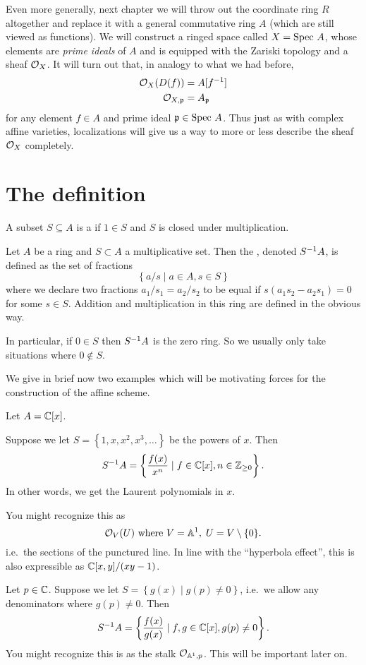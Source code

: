 Even more generally,
next chapter we will throw out the coordinate ring $R$
altogether and replace it with a general commutative ring $A$
(which are still viewed as functions).
We will construct a ringed space called $X = \text{Spec } A$,
whose elements are \emph{prime ideals} of $A$
and is equipped with the Zariski topology and a sheaf $\mathcal O_X$.
It will turn out that, in analogy to what we had before,
\begin{align*}
	\mathcal O_X(D(f)) &= A[f^{-1}] \\
	\mathcal O_{X,\mathfrak p} &= A_\mathfrak p
\end{align*}
for any element $f \in A$ and prime ideal $\mathfrak p \in \text{Spec } A$.
Thus just as with complex affine varieties,
localizations will give us a way to more or less
describe the sheaf $\mathcal O_X$ completely.

\section{The definition}
\begin{definition}
	A subset $S \subseteq A$ is a 
	if $1 \in S$ and $S$ is closed under multiplication.
\end{definition}
\begin{definition}
	Let $A$ be a ring and $S \subset A$ a multiplicative set.
	Then the , denoted $S^{-1} A$,
	is defined as the set of fractions
	\[ \left\{ a/s \mid a \in A, s \in S \right\} \]
	where we declare two fractions $a_1 / s_1 = a_2 / s_2$
	to be equal if $s(a_1s_2 - a_2s_1) = 0$ for some $s \in S$.
	Addition and multiplication in this ring
	are defined in the obvious way.
\end{definition}
In particular, if $0 \in S$ then $S^{-1} A$ is the zero ring.
So we usually only take situations where $0 \notin S$.

We give in brief now two examples which will be
motivating forces for the construction of the affine scheme.
\begin{example}
	[Localizations of {$\CC[x]$}]
	Let $A = \mathbb C[x]$.
	\begin{enumerate}[(a)]
		\ii Suppose we let $S = \left\{ 1, x, x^2, x^3, \dots \right\}$
		be the powers of $x$.
		Then
		\[ S^{-1} A = \left\{ \frac{f(x)}{x^n}
			\mid f \in \mathbb C[x], n \in \mathbb Z_{\ge 0} \right\}.  \]
		In other words, we get the Laurent polynomials in $x$.

		You might recognize this as
		\[ \mathcal O_V(U) \text{ where } V = \mathbb A^1, \; U = V \setminus \{0\}. \]
		i.e.\ the sections of the punctured line.
		In line with the ``hyperbola effect'',
		this is also expressible as $\mathbb C[x,y] / (xy-1)$.

		\ii Let $p \in \mathbb C$.
		Suppose we let $S = \left\{ g(x) \mid g(p) \ne 0 \right\}$,
		i.e.\ we allow any denominators where $g(p) \ne 0$.
		Then
		\[ S^{-1} A = \left\{ \frac{f(x)}{g(x)}
			\mid f,g \in \mathbb C[x], g(p) \ne 0 \right\}.  \]
		You might recognize this is as the stalk $\mathcal O_{\mathbb A^1, p}$.
		This will be important later on.
	\end{enumerate}
\end{example}


